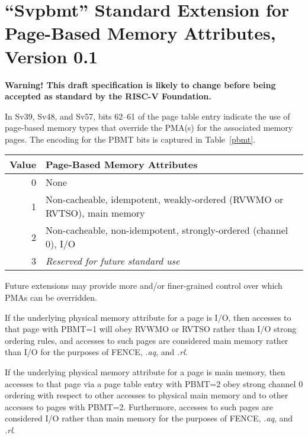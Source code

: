 \chapter{``Svpbmt'' Standard Extension for Page-Based Memory Attributes, Version 0.1}
\label{svpbmt}

{\bf Warning! This draft specification is likely to change before being
accepted as standard by the RISC-V Foundation.}

In Sv39, Sv48, and Sv57, bits 62--61 of the page table entry indicate the use
of page-based memory types that override the PMA(s) for the associated memory
pages.  The encoding for the PBMT bits is captured in Table~\ref{pbmt}.

\begin{table*}[h!]
\begin{center}
\begin{tabular}{|r|l|}
\hline
Value  & Page-Based Memory Attributes \\
\hline
0      & None \\
1      & Non-cacheable, idempotent, weakly-ordered (RVWMO or RVTSO), main memory \\
2      & Non-cacheable, non-idempotent, strongly-ordered (channel 0), I/O \\
3      & {\em Reserved for future standard use} \\
\hline
\end{tabular}
\end{center}
\caption{Encodings for the PBMT field in Sv39, Sv48, and Sv57 PTEs.  Attributes
not mentioned are inherited from the PMA associated with the physical address.}
\label{pbmt}
\end{table*}

\begin{commentary}
Future extensions may provide more and/or finer-grained control over which PMAs
can be overridden.
\end{commentary}

If the underlying physical memory attribute for a page is I/O, then accesses to
that page with PBMT=1 will obey RVWMO or RVTSO rather than I/O strong ordering
rules, and accesses to such pages are considered main memory rather than I/O
for the purposes of FENCE, {\em.aq}, and {\em.rl}.

If the underlying physical memory attribute for a page is main memory, then
accesses to that page via a page table entry with PBMT=2 obey strong channel 0
ordering with respect to other accesses to physical main memory and to other
accesses to pages with PBMT=2.  Furthermore, accesses to such pages are
considered I/O rather than main memory for the purposes of FENCE, {\em.aq}, and
{\em.rl}.

